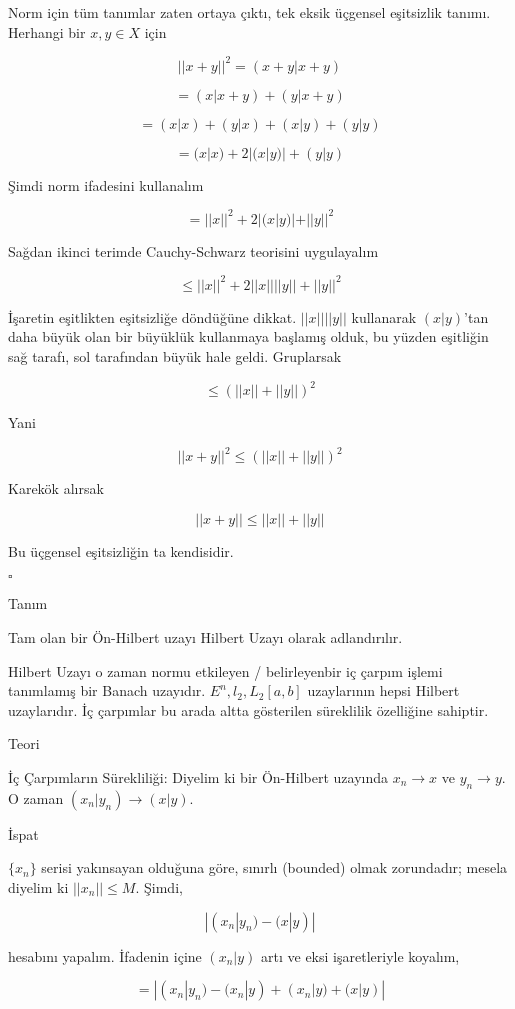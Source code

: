 \documentclass[12pt,fleqn]{article}\usepackage{../../common}
\begin{document}
Norm için tüm tanımlar zaten ortaya çıktı, tek eksik üçgensel eşitsizlik
tanımı. Herhangi bir $x,y \in X$ için 

$$ ||x+y||^2 = (x+y|x+y) $$

$$ = (x|x+y) + (y|x+y) $$

$$ = (x|x) + (y|x) + (x|y) + (y|y) $$

$$ = (x|x) + 2|(x|y)| + (y|y) $$

Şimdi norm ifadesini kullanalım

$$ = ||x||^2 + 2|(x|y)| + ||y||^2 $$

Sağdan ikinci terimde  Cauchy-Schwarz teorisini uygulayalım

$$ \le ||x||^2 + 2||x||||y|| + ||y||^2 $$

İşaretin eşitlikten eşitsizliğe döndüğüne dikkat. $||x||||y||$ kullanarak
$(x|y)$'tan daha büyük olan bir büyüklük kullanmaya başlamış olduk, bu
yüzden eşitliğin sağ tarafı, sol tarafından büyük hale geldi. Gruplarsak

$$ \le (||x||+||y||)^2  $$

Yani

$$ ||x+y||^2 \le (||x||+||y||)^2  $$

Karekök alırsak 

$$ ||x+y|| \le ||x||+||y||  $$

Bu üçgensel eşitsizliğin ta kendisidir. 

$\square$

Tanım 

Tam olan bir Ön-Hilbert uzayı Hilbert Uzayı olarak adlandırılır. 

Hilbert Uzayı o zaman normu etkileyen / belirleyenbir iç çarpım işlemi
tanımlamış bir Banach uzayıdır. $E^n,l_2,L_2[a,b]$ uzaylarının hepsi
Hilbert uzaylarıdır. İç çarpımlar bu arada altta gösterilen süreklilik
özelliğine sahiptir.

Teori 

İç Çarpımların Sürekliliği: Diyelim ki bir Ön-Hilbert uzayında $x_n \to x$
ve $y_n \to y$. O zaman $(x_n|y_n) \to (x|y)$.

İspat

$\{x_n\}$ serisi yakınsayan olduğuna göre, sınırlı (bounded) olmak
zorundadır; mesela diyelim ki $||x_n|| \le M$. Şimdi,

$$ |(x_n|y_n) - (x|y)| $$

hesabını yapalım. İfadenin içine $(x_n|y)$ artı ve eksi işaretleriyle
koyalım, 

$$ = |(x_n|y_n) - (x_n|y) + (x_n|y) + (x|y)| $$
\end{document}
